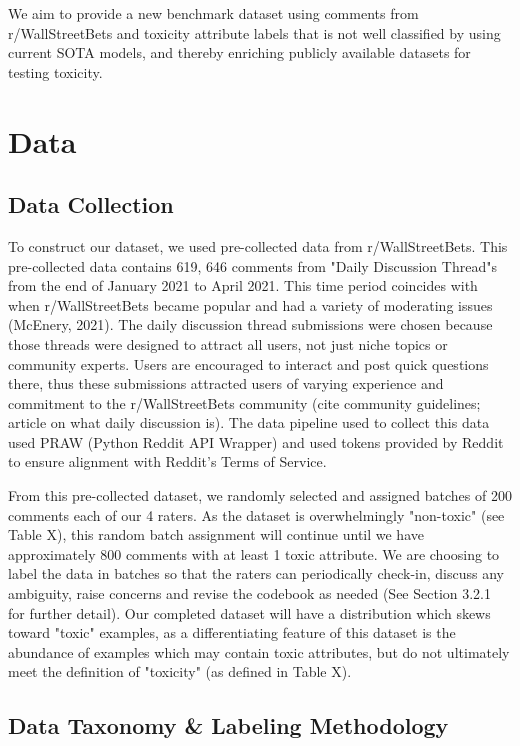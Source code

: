 \documentclass[11pt]{article}
\begin{document}
We aim to provide a new benchmark dataset using comments from r/WallStreetBets and toxicity attribute labels that is not well classified by using current SOTA models, and thereby enriching publicly available datasets for testing toxicity.


\section{Data}
\subsection{Data Collection}
To construct our dataset, we used pre-collected data from r/WallStreetBets. This pre-collected data contains 619, 646 comments from "Daily Discussion Thread"s from the end of January 2021 to April 2021. This time period coincides with when  r/WallStreetBets became popular and had a variety of moderating issues (McEnery, 2021). The daily discussion thread submissions were chosen because those threads were designed to attract all users, not just niche topics or community experts. Users are encouraged to interact and post quick questions there, thus these submissions attracted users of varying experience and commitment to the r/WallStreetBets community (cite community guidelines; article on what daily discussion is). The data pipeline used to collect this data used PRAW (Python Reddit API Wrapper) and used tokens provided by Reddit to ensure alignment with Reddit's Terms of Service. 


From this pre-collected dataset, we randomly selected and assigned batches of 200 comments each of our 4 raters. As the dataset is overwhelmingly "non-toxic" (see Table X), this random batch assignment will continue until we have approximately 800 comments with at least 1 toxic attribute. We are choosing to label the data in batches so that the raters can periodically check-in, discuss any ambiguity, raise concerns and revise the codebook as needed (See Section 3.2.1 for further detail). Our completed dataset will have a distribution which skews toward "toxic" examples, as a differentiating feature of this dataset is the abundance of examples which may contain toxic attributes, but do not ultimately meet the definition of "toxicity" (as defined in Table X).

\subsection{Data Taxonomy & Labeling Methodology}
\end{document}
